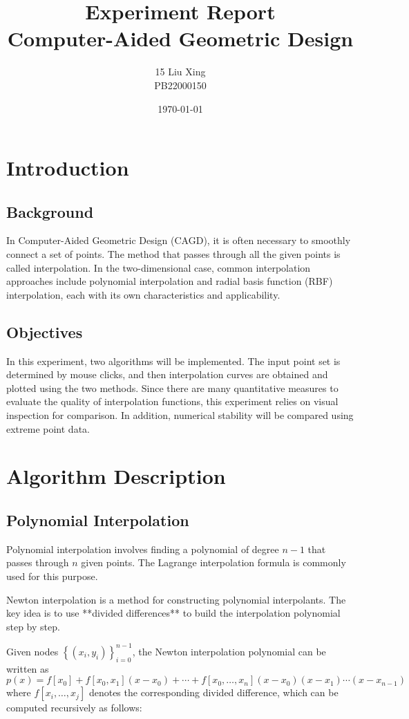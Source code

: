 \documentclass[12pt,a4paper]{report}
\title{
    \vspace{3cm}
    \textbf{Experiment Report}\\[0.5cm]
    \Large Computer-Aided Geometric Design\\[0.5cm]
    \vspace{2cm}
}
\author{15 Liu Xing \\ PB22000150}
\date{\today}
\begin{document}
    \maketitle
    \tableofcontents
    \newpage

    \chapter{Introduction}
        \section{Background}
            In Computer-Aided Geometric Design (CAGD), it is often necessary to smoothly connect a set of points. The method that passes through all the given points is called interpolation. In the two-dimensional case, common interpolation approaches include polynomial interpolation and radial basis function (RBF) interpolation, each with its own characteristics and applicability.

        \section{Objectives}
            In this experiment, two algorithms will be implemented. The input point set is determined by mouse clicks, and then interpolation curves are obtained and plotted using the two methods. Since there are many quantitative measures to evaluate the quality of interpolation functions, this experiment relies on visual inspection for comparison. In addition, numerical stability will be compared using extreme point data.

    \chapter{Algorithm Description}
        \section{Polynomial Interpolation}
            Polynomial interpolation involves finding a polynomial of degree $n-1$ that passes through $n$ given points. The Lagrange interpolation formula is commonly used for this purpose. 

            Newton interpolation is a method for constructing polynomial interpolants. The key idea is to use **divided differences** to build the interpolation polynomial step by step.

            Given nodes $\left\{\left(x_{i}, y_{i}\right)\right\}_{i=0}^{n-1}$, the Newton interpolation polynomial can be written as
            \begin{equation*}
                p\left(x\right) = f\left[x_{0}\right] + f\left[x_{0}, x_{1}\right]\left(x - x_{0}\right) + \cdots + f\left[x_{0}, \dots, x_{n}\right]\left(x - x_{0}\right)\left(x - x_{1}\right)\cdots\left(x - x_{n-1}\right)
            \end{equation*}
            where $f\left[x_{i},\dots,x_{j}\right]$ denotes the corresponding divided difference, which can be computed recursively as follows:
\end{document}

